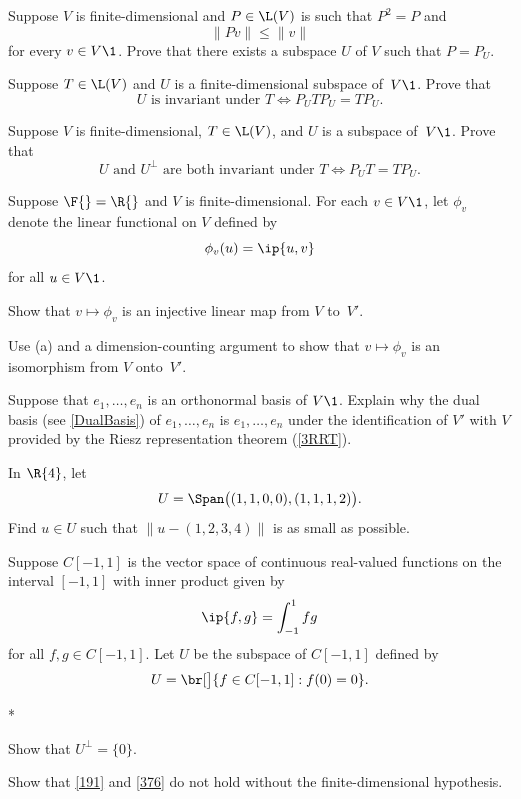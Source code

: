 \exercise
Suppose $V$ is finite-dimensional and $P \in \L(V)$ is such that $P^2 = P$ and
\[
\|Pv\| \le \|v\|
\]
for every $v \in V\1$.  Prove that there exists a subspace $U$ of $V$ such that $P = P_{\!U}$.


\exercise
Suppose $T \in \L(V)$ and $U$ is a finite-dimensional subspace of~$V\1$.  Prove that\label{6invP}
\[
U \text{ is invariant under } T \iff P_{\!U} T P_{\!U} = T P_{\!U}.
\]
\exercisedisplayend


\exercise
Suppose $V$ is finite-dimensional, $T \in \L(V)$, and $U$ is a subspace of~$V\1$.  Prove that
\[
U \text{ and } U^\perp \text{ are both invariant under } T \iff P_{\!U} T = T P_{\!U}.
\]
\exercisedisplayend


\exercise
Suppose $\F{} = \R{}$ and $V$ is finite-dimensional. For each $v \in V\1$, let $\phi_v$ denote the linear functional on $V$ defined by \label{VVpiso}
\[
\phi_v(u) = \ip{u, v}
\]
for all $u \in V\1$.
\begin{subtheorem}
\item
Show that $v \mapsto \phi_v$ is an injective linear map from $V$ to~$V'\!$.
\item
Use (a) and a dimension-counting argument to show that $v \mapsto \phi_v$ is an isomorphism from $V$ onto~$V'\!$.
\end{subtheorem}


\exercise
Suppose that $e_1, \ldots, e_n$ is an orthonormal basis of $V\1$. Explain why the dual basis (see \ref{DualBasis}) of
$e_1, \ldots, e_n$ is $e_1, \ldots, e_n$ under the identification of $V'$ with $V$ provided by the Riesz representation theorem (\ref{3RRT}).


\exercise
In $\R{4}$, let
\[
U = \Span \bigl( (1, 1, 0, 0), (1, 1, 1, 2) \bigr).
\]
Find $u \in U$ such that $\| u - (1,2,3,4) \|$ is as small as possible.


\exercise
Suppose $C[-1, 1]$ is the vector space of continuous real-valued functions on the interval $[-1 ,1]$ with inner product given by \label{dense}
\[
\ip{f, g} = \int_{-1}^1 fg
\]
for all $f, g \in C[-1, 1]$. Let $U$ be the subspace of $C[-1, 1]$ defined by
\[ %
U = \br[\big]{ f \in C[-1, 1]: f(0) = 0 }.
\]
\begin{subtheorem}*
\item
Show that $U^\perp = \{0\}$.
\item
Show that \ref{191} and \ref{376} do not hold without the finite-dimensional hypothesis.
\end{subtheorem}
\exercisesubtheoremend


